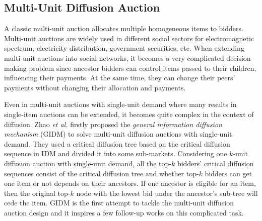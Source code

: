 \documentclass{article}
\begin{document}

 
\subsection{Multi-Unit Diffusion Auction}
A classic multi-unit auction allocates multiple homogeneous items to bidders. Multi-unit auctions are widely used in different social sectors for electromagnetic spectrum\cite{cramton1997fcc,cramton2000collusive}, electricity distribution, government securities, etc. When extending multi-unit auctions into social networks, it becomes a very complicated decision-making problem since ancestor bidders can control items passed to their children, influencing their payments. At the same time, they can change their peers' payments without changing their allocation and payments. 

Even in multi-unit auctions with single-unit demand where many results \cite{krishna2009auction} in single-item auctions can be extended, it becomes quite complex in the context of diffusion. Zhao \emph{et al.}  firstly proposed the \emph{general information diffusion mechanism} (GIDM) to solve multi-unit diffusion auctions with single-unit demand. They used a critical diffusion tree based on the critical diffusion sequence in IDM and divided it into some sub-markets. Considering one $k$-unit diffusion auction with single-unit demand, all the top-$k$ bidders' critical diffusion sequences consist of the critical diffusion tree and whether top-$k$ bidders can get one item or not depends on their ancestors. If one ancestor is eligible for an item, then the original top-$k$ node with the lowest bid under the ancestor's sub-tree will cede the item. GIDM is the first attempt to tackle the multi-unit diffusion auction design and it inspires a few follow-up works on this complicated task. 
\end{document}
